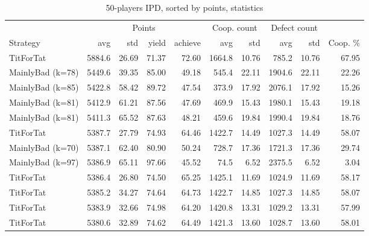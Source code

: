 \documentclass[journal,a4paper,10pt,twoside]{IEEEtran} %
\begin{document}
\begin{table}[ht]
	\caption{50-players IPD, sorted by points, statistics}
	\label{tab:ipdmp50}
	\centering
	\begin{tabular}{l|rrrr|rrrrr} \toprule
		                  & \multicolumn{4}{c}{Points}            & \multicolumn{2}{c}{Coop. count} & \multicolumn{2}{c}{Defect count} &        \\
		Strategy          &    avg &   std &     yield &  achieve &    avg &                    std &    avg &                     std & Coop. \% \\ \midrule
		TitForTat         & 5884.6 & 26.69 &     71.37 &    72.60 & 1664.8 &                  10.76 &  785.2 &                   10.76 &  67.95 \\
		MainlyBad (k=78)  & 5449.6 & 39.35 &     85.00 &    49.18 &  545.4 &                  22.11 & 1904.6 &                   22.11 &  22.26 \\
		MainlyBad (k=85)  & 5422.8 & 58.42 &     89.72 &    47.54 &  373.9 &                  17.92 & 2076.1 &                   17.92 &  15.26 \\
		MainlyBad (k=81)  & 5412.9 & 61.21 &     87.56 &    47.69 &  469.9 &                  15.43 & 1980.1 &                   15.43 &  19.18 \\
		MainlyBad (k=81)  & 5411.3 & 65.52 &     87.63 &    48.21 &  459.6 &                  19.84 & 1990.4 &                   19.84 &  18.76 \\
		TitForTat         & 5387.7 & 27.79 &     74.93 &    64.46 & 1422.7 &                  14.49 & 1027.3 &                   14.49 &  58.07 \\
		MainlyBad (k=70)  & 5387.1 & 62.40 &     80.90 &    50.24 &  728.7 &                  17.36 & 1721.3 &                   17.36 &  29.74 \\
		MainlyBad (k=97)  & 5386.9 & 65.11 &     97.66 &    45.52 &   74.5 &                   6.52 & 2375.5 &                    6.52 &   3.04 \\
		TitForTat         & 5386.4 & 26.80 &     74.50 &    65.25 & 1425.1 &                  11.69 & 1024.9 &                   11.69 &  58.17 \\
		TitForTat         & 5385.2 & 34.27 &     74.64 &    64.73 & 1422.7 &                  14.85 & 1027.3 &                   14.85 &  58.07 \\
		TitForTat         & 5383.9 & 32.66 &     74.98 &    64.20 & 1420.8 &                  13.31 & 1029.2 &                   13.31 &  57.99 \\
		TitForTat         & 5380.6 & 32.89 &     74.62 &    64.49 & 1421.3 &                  13.60 & 1028.7 &                   13.60 &  58.01 \\

\end{tabular}
\end{table}
\end{document}
